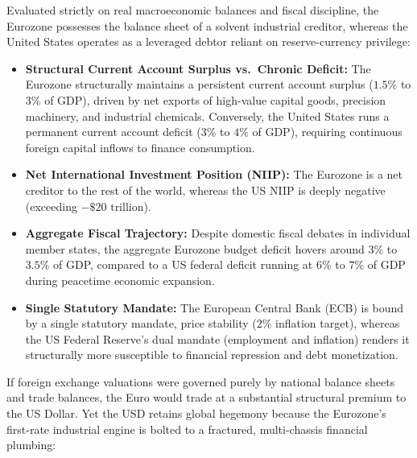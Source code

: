 \documentclass[a4paper,11pt,twoside,parskip=half-,headings=small]{scrartcl}
\begin{document}
Evaluated strictly on real macroeconomic balances and fiscal discipline, the Eurozone possesses the balance sheet of a solvent industrial creditor, whereas the United States operates as a leveraged debtor reliant on reserve-currency privilege:
\begin{itemize}[nosep]
  \item \textbf{Structural Current Account Surplus vs.\ Chronic Deficit:} The Eurozone structurally maintains a persistent current account surplus ($1.5\%$ to $3\%$ of GDP), driven by net exports of high-value capital goods, precision machinery, and industrial chemicals. Conversely, the United States runs a permanent current account deficit ($3\%$ to $4\%$ of GDP), requiring continuous foreign capital inflows to finance consumption.
  \item \textbf{Net International Investment Position (NIIP):} The Eurozone is a net creditor to the rest of the world, whereas the US NIIP is deeply negative (exceeding $-\$20\text{ trillion}$).
  \item \textbf{Aggregate Fiscal Trajectory:} Despite domestic fiscal debates in individual member states, the aggregate Eurozone budget deficit hovers around $3\%$ to $3.5\%$ of GDP, compared to a US federal deficit running at $6\%$ to $7\%$ of GDP during peacetime economic expansion.
  \item \textbf{Single Statutory Mandate:} The European Central Bank (ECB) is bound by a single statutory mandate, price stability ($2\%$ inflation target), whereas the US Federal Reserve's dual mandate (employment and inflation) renders it structurally more susceptible to financial repression and debt monetization.
\end{itemize}
If foreign exchange valuations were governed purely by national balance sheets and trade balances, the Euro would trade at a substantial structural premium to the US Dollar. Yet the USD retains global hegemony because the Eurozone's first-rate industrial engine is bolted to a fractured, multi-chassis financial plumbing:
\end{document}
